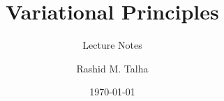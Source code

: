 \documentclass[11pt]{cauchy}
\title{Variational Principles}
\subtitle{Lecture Notes}
\author{Rashid M. Talha}
\affiliation{School of Natural Sciences, NUST}
\date{\today}
\begin{document}


\frontmatter
\tableofcontents\clearpage



\mainmatter



% 
% 
% 
% 
% 
% 
% 

\appendix




\nocite{*}
\clearpage
{\small}

% 
\end{document}
